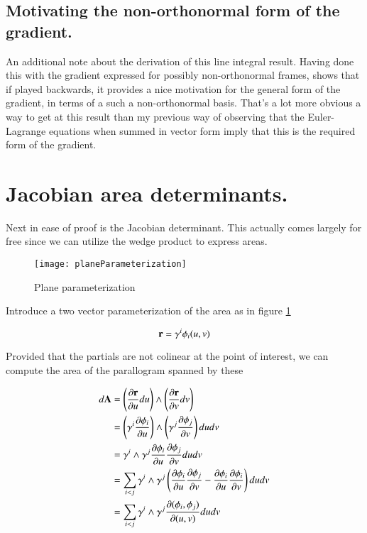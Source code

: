 \documentclass{article}
\newcommand{\PD}[2]{\frac{\partial {#2}}{\partial {#1}}}
\begin{document}
\subsection{ Motivating the non-orthonormal form of the gradient. }

An additional note about the derivation of this line integral result.  Having done this with the gradient expressed for possibly non-orthonormal frames, 
shows that if played backwards, it provides a nice motivation for the general form of the gradient, in terms
of a such a non-orthonormal basis.  That's a lot more obvious a way to get at this result than my previous way of observing that the Euler-Lagrange
equations when summed in vector form imply that this is the required form of the gradient.

\section{ Jacobian area determinants. }

Next in ease of proof is the Jacobian determinant.  This actually comes largely for free since we can utilize the wedge product to
express areas.

\begin{figure}[htp]
\centering
\texttt{[image: planeParameterization]}
\caption{Plane parameterization}\label{fig:planeParameterization}
\end{figure}

Introduce a two vector parameterization of the area as in figure \ref{fig:planeParameterization}

\begin{equation*}
\mathbf{r} = \gamma^{i} \phi_i(u,v)
\end{equation*}

Provided that the partials are not colinear at the point of interest, we can compute the area of the parallogram spanned by these

\begin{align*}
d\BA 
&= \left(\PD{u}{\Br} du\right) \wedge \left(\PD{v}{\Br} dv\right) \\
&= \left(\gamma^{i} \PD{u}{\phi_i}\right) \wedge \left(\gamma^{j} \PD{v}{\phi_j} \right) du dv \\
&= \gamma^{i} \wedge \gamma^{j} \PD{u}{\phi_i} \PD{v}{\phi_j} du dv \\
&= \sum_{i<j} \gamma^{i} \wedge \gamma^{j} \left( \PD{u}{\phi_i} \PD{v}{\phi_j} - \PD{u}{\phi_i} \PD{v}{\phi_i} \right) du dv \\
&= \sum_{i<j} \gamma^{i} \wedge \gamma^{j} \PD{(u,v)}{(\phi_i,\phi_j)} du dv \\
\end{align*}
\end{document}
